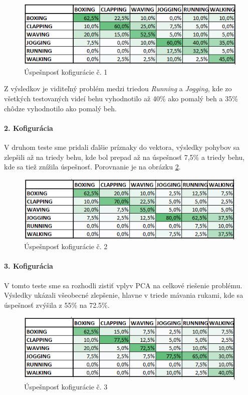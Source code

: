 \begin{figure}[H]
  \centering
  \includegraphics[width=14cm]{img/test6classes1g.png}
  \caption{Úspešnposť kofigurácie č. 1}
  \label{test1}
\end{figure} 

Z výsledkov je viditeľný problém medzi triedou \textit{Running} a \textit{Jogging}, kde zo všetkých testovaných videí behu vyhodnotilo až 40\% ako pomalý beh a 35\% chôdze vyhodnotilo ako pomalý beh. 


\paragraph{2. Kofigurácia} 
V druhom teste sme pridali ďalšie príznaky do vektora, výsledky pohybov sa zlepšili až na triedy behu, kde bol prepad až na úspešnosť 7,5\% a triedy behu, kde sa tiež znížila úspešnosť. Porovnanie je na obrázku \ref{test2}.


\begin{figure}[H]
  \centering
  \includegraphics[width=14cm]{img/test6classes11g.png}
  \caption{Úspešnposť kofigurácie č. 2}
  \label{test2}
\end{figure} 

\paragraph{3. Kofigurácia} 
V tomto teste sme sa rozhodli zistiť vplyv PCA na celkové riešenie problému. Výsledky ukázali všeobecné zlepšenie, hlavne v triede mávania rukami, kde sa úspešnosť zvýšila z 55\% na 72.5\%.  
\begin{figure}[H]
  \centering
  \includegraphics[width=14cm]{img/test6classes11PCA1g.png}
  \caption{Úspešnposť kofigurácie č. 3}
  \label{test3}
\end{figure} 


